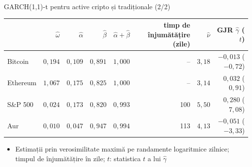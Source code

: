 \begin{frame}{GARCH(1,1)-t pentru active cripto și tradiționale (2/2)}
\itemsize{\footnotesize}
\begin{center}
\scriptsize
\begin{tabular}{lrrrrrrr}
\toprule
& $\hat\omega$ & $\hat\alpha$ & $\hat\beta$ & $\hat\alpha + \hat\beta$ & timp de înjumătățire (zile) & $\hat\nu$ & GJR $\hat\gamma$ ($t$) \\
\midrule
Bitcoin & $0{,}194$ & $0{,}109$ & $0{,}891$ & $1{,}000$ & -- & $3{,}18$ & $-0{,}013$ ($-0{,}72$) \\
Ethereum & $1{,}067$ & $0{,}175$ & $0{,}825$ & $1{,}000$ & -- & $3{,}14$ & $0{,}032$ ($0{,}91$) \\
S\&P 500 & $0{,}024$ & $0{,}173$ & $0{,}820$ & $0{,}993$ & 100 & $5{,}50$ & $0{,}280$ ($7{,}08$) \\
Aur & $0{,}010$ & $0{,}047$ & $0{,}947$ & $0{,}994$ & 113 & $4{,}13$ & $-0{,}051$ ($-3{,}33$) \\
\bottomrule
\end{tabular}
\end{center}
\begin{itemize}
    \item Estimații prin verosimilitate maximă pe randamente logaritmice zilnice; timpul de înjumătățire în zile; $t$: statistica $t$ a lui $\hat\gamma$
\end{itemize}
\end{frame}

